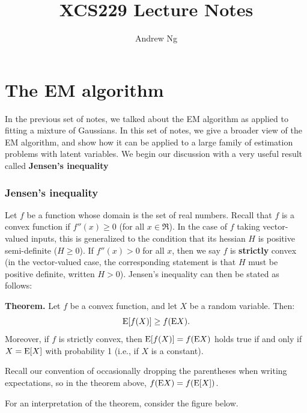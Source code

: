 \documentclass{article}
\begin{document}
\title{XCS229 Lecture Notes}
\author{Andrew Ng}
\date{}
\maketitle



\setcounter{part}{8}
\part{The EM algorithm}

In the previous set of notes, we talked about the EM algorithm
as applied to fitting a mixture of Gaussians.  In this set of notes,
we give a broader view of the EM algorithm, and show how it can
be applied to a large family of estimation problems
with latent variables.  We begin our discussion with a very useful result
called {\bf Jensen's inequality}


\section{Jensen's inequality}

Let $f$ be a function whose domain is the set of real numbers.
Recall that $f$ is a convex function if $f''(x) \geq 0$ (for all $x \in \Re$).
In the case of $f$ taking vector-valued inputs, this is generalized to
the condition that its hessian $H$ is positive semi-definite ($H \geq 0$).
If $f''(x) > 0$ for all $x$, then we say $f$ is {\bf strictly} convex
(in the vector-valued case, the corresponding statement is that $H$ must
be positive definite, written $H > 0$).  Jensen's inequality
can then be stated as follows:

\medskip
\noindent
{\bf Theorem.} Let $f$ be a convex function, and let $X$ be a random variable.
Then:
\[
{\rm E}[f(X)] \geq f({\rm E} X).
\]
Moreover, if $f$ is strictly convex, then
${\rm E}[f(X)] = f({\rm E} X)$ holds true if and only if $X = {\rm E}[X]$ with
probability 1 (i.e., if $X$ is a constant).
\medskip

Recall our convention of occasionally dropping the parentheses when
writing expectations, so in the theorem above, $f({\rm E} X) = f({\rm E}[X])$.

For an interpretation of the theorem, consider the figure below.
\end{document}
